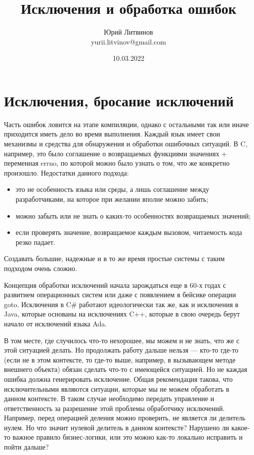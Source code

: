 \documentclass[a5paper]{article}
\title{Исключения и обработка ошибок}
\author{Юрий Литвинов\\\small{yurii.litvinov@gmail.com}}
\date{10.03.2022}
\begin{document}
\maketitle
\thispagestyle{empty}

\section{Исключения, бросание исключений}

Часть ошибок ловится на этапе компиляции, однако с остальными так или иначе приходится иметь дело во время выполнения. Каждый язык имеет свои механизмы и средства для обнаружения и обработки ошибочных ситуаций. В C, например, это было соглашение о возвращаемых функциями значениях + переменная errno, по которой можно было узнать о том, что же конкретно произошло. Недостатки данного подхода:

\begin{itemize}
    \item это не особенность языка или среды, а лишь соглашение между разработчиками, на которое при желании вполне можно забить;
    \item можно забыть или не знать о каких-то особенностях возвращаемых значений;
    \item если проверять значение, возвращаемое каждым вызовом, читаемость кода резко падает.
\end{itemize}

Создавать большие, надежные и в то же время простые системы с таким подходом очень сложно.

Концепция обработки исключений начала зарождаться еще в 60-х годах с развитием операционных систем или даже с появлением в бейсике операции goto. Исключения в C\# работают идеологически так же, как и исключения в Java, которые основаны на исключениях C++, которые в свою очередь берут начало от исключений языка Ada.

В том месте, где случилось что-то нехорошее, мы можем и не знать, что же с этой ситуацией делать. Но продолжать работу дальше нельзя --- кто-то где-то (если не в этом контексте, то где-то выше, например, в вызывающем методе внешнего объекта) обязан сделать что-то с имеющейся ситуацией. Но не каждая ошибка должна генерировать исключение. Общая рекомендация такова, что исключительными являются ситуации, которые мы не можем обработать в данном контексте. В таком случае необходимо передать управление и ответственность за разрешение этой проблемы обработчику исключений. Например, перед операцией деления можно проверить, не является ли делитель нулем. Но что значит нулевой делитель в данном контексте? Нарушено ли какое-то важное правило бизнес-логики, или это можно как-то локально исправить и пойти дальше?
\end{document}
